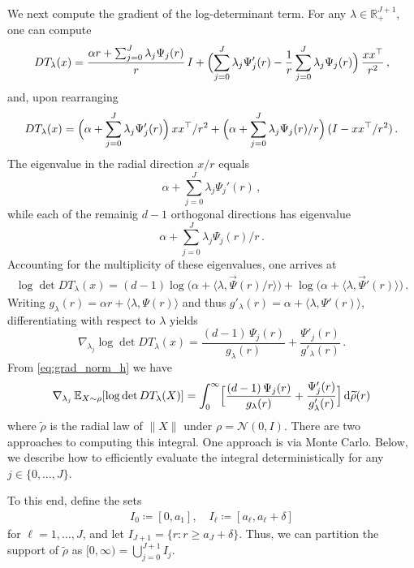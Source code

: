 \documentclass[twoside]{article}
\newcommand{\cN}{\mathcal{N}}
\newcommand{\1}{\mathds{1}}
\newcommand{\R}{\mathbb{R}}
\newcommand*{\defeq}{\coloneqq}
\newcommand*{\rd}{\mathrm{d}}
\newcommand*{\dd}{\, \rd}
\theoremstyle{plain}
\theoremstyle{definition}
\theoremstyle{remark}
\renewcommand{\tilde}{\widetilde}
\begin{document}
We next compute the gradient of the log-determinant term. For any $\lambda \in \R^{J+1}_+$, one can compute
\begin{align*}
    DT_\lambda(x)
=\frac{\alpha r+\sum_{j=0}^J \lambda_j \Psi_j(r)}{r}\,I
+\Bigl(\sum_{j=0}^J \lambda_j \Psi_j'(r) - \frac{1}{r}\sum_{j=0}^J \lambda_j \Psi_j(r)\Bigr)\,\frac{xx^\top}{r^2}\,,
\end{align*}
and, upon rearranging
\begin{align*}
    DT_\lambda(x) = \Bigl(\alpha + \sum_{j=0}^J \lambda_j \Psi'_j(r)\Bigr)\,xx^\top/r^2+ \Bigl(\alpha + \sum_{j=0}^J {\lambda_j} \Psi_j(r)/r\Bigr)\,(I - xx^\top/r^2)\,.
\end{align*}
The eigenvalue in the radial direction $x/r$ equals
\[
\alpha+\sum_{j=0}^J \lambda_j \Psi_j'(r)\,,
\]
while each of the remainig $d-1$ orthogonal directions has eigenvalue
\[
\alpha +\sum_{j=0}^J \lambda_j \Psi_j(r)/r\,.
\]
Accounting for the multiplicity of these eigenvalues, one arrives at 
\begin{align*}
\log\det DT_\lambda(x)
=(d-1)\log\bigl(\alpha +\langle \lambda,\vec\Psi(r)/r\rangle\bigr)
+\log\bigl(\alpha+\langle \lambda,\vec\Psi'(r)\rangle\bigr)\,.
\end{align*}
Writing $g_\lambda(r) = \alpha r + \langle \lambda, \Psi(r)\rangle$ and thus {$g'_\lambda(r) = \alpha+ \langle \lambda, \Psi'(r)\rangle$, differentiating with respect to $\lambda$ yields
\begin{equation}\label{eq:grad_norm_h}
\nabla_{\lambda_j}\log\det DT_\lambda(x)
= \frac{(d-1)\,\Psi_j(r)}{g_\lambda(r)} + \frac{\Psi'_j(r)}{g'_\lambda(r)}\,.
\end{equation}}
From \eqref{eq:grad_norm_h} we have
\begin{align}\label{eq:gradlogdet_app}
\nabla_{\lambda_j}\,\mathbb E_{X \sim \rho}[\log\det DT_\lambda(X)]
=\int_0^\infty
\Bigl[\frac{(d-1)\,\Psi_j(r)}{g_\lambda(r)} + \frac{\Psi'_j(r)}{g'_\lambda(r)}\Bigr]\dd\tilde\rho(r)    
\end{align}
where $\tilde\rho$ is the radial law of $\|X\|$ under $\rho = \cN(0,I)$. There are two approaches to computing this integral. {One approach is via Monte Carlo. Below, we describe how to efficiently evaluate the integral deterministically for any $j \in \{0,\ldots,J\}$.}

To this end, define the sets
\begin{align*}
    I_0 \defeq [0,a_1], \quad I_\ell \defeq [a_\ell, a_\ell + \delta]
\end{align*}
for $\ell = 1,\ldots,J$, and let $I_{J+1} = \{r : r \geq a_J + \delta\}$. Thus, we can partition the support of $\tilde\rho$ as $[0,\infty) = \bigcup_{j=0}^{J+1}I_j$.
\end{document}
